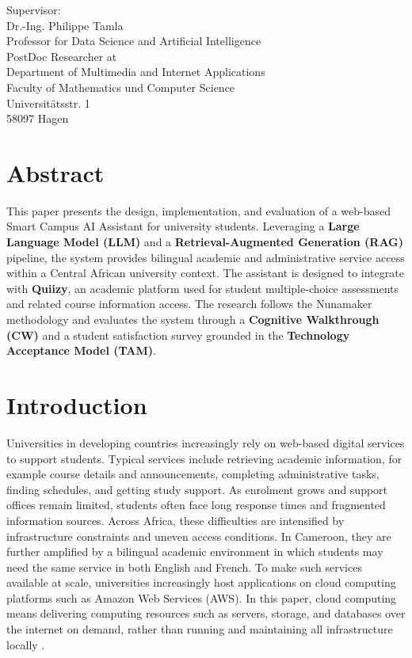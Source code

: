 \documentclass[a4paper,9pt,twocolumn]{extarticle}
\begin{document}
\mytitle

\newpage
{}
\noindent
Supervisor:\\
Dr.-Ing. Philippe Tamla\\
Professor for Data Science and Artificial Intelligence\\
PostDoc Researcher at\\
Department of Multimedia and Internet Applications\\
Faculty of Mathematics und Computer Science\\
Universit\"atsstr. 1\\
58097 Hagen\\
\vfil\null

\newpage
\section*{Abstract}
This paper presents the design, implementation, and evaluation of a
web-based Smart Campus AI Assistant for university students. Leveraging a
\textbf{Large Language Model (LLM)} and a \textbf{Retrieval-Augmented Generation (RAG)}
pipeline, the system provides bilingual academic and administrative
service access within a Central African university context. The assistant
is designed to integrate with \textbf{Quiizy}, an academic platform used for
student multiple-choice assessments and related course information
access. The research follows the Nunamaker methodology and evaluates the
system through a \textbf{Cognitive Walkthrough (CW)} and a student satisfaction
survey grounded in the \textbf{Technology Acceptance Model (TAM)}.

\newpage
\tableofcontents
\newpage
\listoffigures
\newpage
\listoftables
\newpage
\listoflistings
\newpage
\twocolumn
\mainmatter

\section{Introduction}
\label{sec:intro}

Universities in developing countries increasingly rely on web-based
digital services to support students. Typical services include
retrieving academic information, for example course details and
announcements, completing administrative tasks, finding schedules, and
getting study support. As enrolment grows and support offices remain
limited, students often face long response times and fragmented
information sources. Across Africa, these difficulties are intensified
by infrastructure constraints and uneven access conditions. In Cameroon,
they are further amplified by a bilingual academic environment in which
students may need the same service in both English and French. To make
such services available at scale, universities increasingly host
applications on cloud computing platforms such as Amazon Web Services
(AWS). In this paper, cloud computing means delivering computing
resources such as servers, storage, and databases over the internet on
demand, rather than running and maintaining all infrastructure locally
\cite{shukur2020cloud,rashid2018distributed}.
\end{document}
